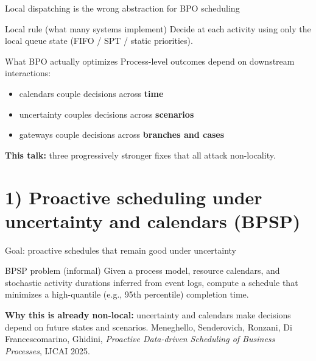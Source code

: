 \documentclass[aspectratio=169,10pt]{beamer}
\newcommand{\btext}[1]{\textbf{\color{darkred}#1}}
\newcommand{\smallref}[1]{{\scriptsize\color{darkgray}#1}}
\begin{document}
\begin{frame}{Local dispatching is the wrong abstraction for BPO scheduling}
  \begin{block}{Local rule (what many systems implement)}
    Decide at each activity using only the local queue state (FIFO / SPT / static priorities).
  \end{block}
  \vspace{0.1cm}
  \begin{block}{What BPO actually optimizes}
    Process-level outcomes depend on downstream interactions:
    \begin{itemize}
      \item calendars couple decisions across \btext{time}
      \item uncertainty couples decisions across \btext{scenarios}
      \item gateways couple decisions across \btext{branches and cases}
    \end{itemize}
  \end{block}
  \vspace{0.15cm}
  \btext{This talk:} three progressively stronger fixes that all attack non-locality.
\end{frame}

\section{1) Proactive scheduling under uncertainty and calendars (BPSP)}

\begin{frame}{Goal: proactive schedules that remain good under uncertainty}
  \begin{block}{BPSP problem (informal)}
    Given a process model, resource calendars, and stochastic activity durations inferred from event logs,
    compute a schedule that minimizes a high-quantile (e.g., 95th percentile) completion time.
  \end{block}
  \vspace{0.2cm}
  \btext{Why this is already non-local:}
  uncertainty and calendars make decisions depend on future states and scenarios.
  \vspace{0.2cm}
  \smallref{Meneghello, Senderovich, Ronzani, Di Francescomarino, Ghidini, \emph{Proactive Data-driven Scheduling of Business Processes}, IJCAI 2025.}
\end{frame}
\end{document}
